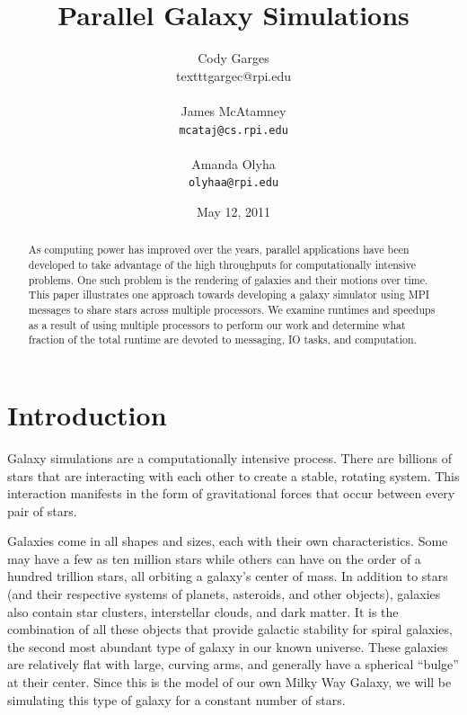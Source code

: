 \documentclass{article}
\begin{document}
\twocolumn

\title{Parallel Galaxy Simulations}

\author{Cody Garges \\ texttt{gargec@rpi.edu} \\ \\
	James McAtamney \\ \texttt{mcataj@cs.rpi.edu} \\ \\
	Amanda Olyha \\ \texttt{olyhaa@rpi.edu} }  
\date{May 12, 2011}	
 
\maketitle


\begin{abstract}

As computing power has improved over the years, parallel applications have been developed to take advantage of the high throughputs for computationally intensive problems.  One such problem is the rendering of galaxies and their motions over time.  This paper illustrates one approach towards developing a galaxy simulator using MPI messages to share stars across multiple processors.  We examine runtimes and speedups as a result of using multiple processors to perform our work and determine what fraction of the total runtime are devoted to messaging, IO tasks, and computation.

\end{abstract}

\section{Introduction}

Galaxy simulations are a computationally intensive process.  There are billions of stars that are interacting with each other to create a stable, rotating system.  This interaction manifests in the form of gravitational forces that occur between every pair of stars. 

Galaxies come in all shapes and sizes, each with their own characteristics.  Some may have a few as ten million stars while others can have on the order of a hundred trillion stars, all orbiting a galaxy's center of mass.  In addition to stars (and their respective systems of planets, asteroids, and other objects), galaxies also contain star clusters, interstellar clouds, and dark matter.  It is the combination of all these objects that provide galactic stability for spiral galaxies, the second most abundant type of galaxy in our known universe.  These galaxies are relatively flat with large, curving arms, and generally have a spherical ``bulge'' at their center.   Since this is the model of our own Milky Way Galaxy, we will be simulating this type of galaxy for a constant number of stars.
\end{document}
